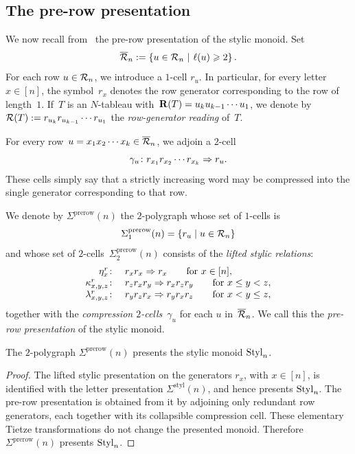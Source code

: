 \documentclass[a4paper, twoside, 11pt, english]{article}
\begin{document}
\subsection{The pre-row presentation}
\label{SS:PreRowPresentation}
We now recall from~\cite{LuoJinZhangStylic} the pre-row presentation of
the stylic monoid. Set
\[
\overline{\mathcal{R}}_n
:=
\left\{
u\in\mathcal{R}_n
\ \middle|\
\ell(u)\geqslant2
\right\}.
\]
For each row $u\in \mathcal{R}_n$, we introduce a $1$-cell $r_u$.
In particular, for every letter $x\in [n]$, the symbol~$r_x$ denotes the row generator
corresponding to the row of length~$1$. If~$T$ is an $N$-tableau with~$\mathbf{R}(T)= u_k u_{k-1} \cdots u_1$, we
denote by~$\mathcal{R}(T):=r_{u_k}r_{u_{k-1}}\cdots r_{u_1}$ the \emph{row-generator reading} of~$T$.

For every row~$u=x_1x_2\cdots x_k\in \overline{\mathcal{R}}_n$,
we adjoin a $2$-cell
\[
\gamma_u\colon r_{x_1}r_{x_2}\cdots r_{x_k}\Rightarrow r_u.
\]
These cells simply say that a strictly increasing word may be compressed into the single
generator corresponding to that row.

We denote by $\Sigma^{\mathrm{prerow}}(n)$ the $2$-polygraph whose set of $1$-cells is
\[
\Sigma^{\mathrm{prerow}}_1(n)=\{r_u\mid u\in \mathcal{R}_n\}
\]
and whose set of $2$-cells~$\Sigma^{\mathrm{prerow}}_2(n)$ consists of the \emph{lifted stylic relations}:
\[
\begin{array}{rl}
\eta_x^r\colon& r_xr_x\Rightarrow r_x
\qquad
\text{for }x\in [n],\\
\kappa_{x,y,z}^r\colon& r_zr_xr_y\Rightarrow r_xr_zr_y
\qquad
\text{for }x\le y<z,\\
\lambda_{x,y,z}^r\colon& r_yr_zr_x\Rightarrow r_yr_xr_z
\qquad
\text{for }x<y\le z,
\end{array}
\]
together with the \emph{compression $2$-cells}~$\gamma_u$ for each $u$ in~$\overline{\mathcal{R}}_n$.
We call this the \emph{pre-row presentation} of the stylic monoid.

\begin{proposition}
\label{P:PrerowPresentsStylic} 
The $2$-polygraph $\Sigma^{\mathrm{prerow}}(n)$ presents the stylic monoid $\mathrm{Styl}_n$. 
\end{proposition}

\begin{proof}
The lifted stylic presentation on the generators $r_x$, with $x\in[n]$, is
identified with the letter presentation $\Sigma^{\mathrm{styl}}(n)$, and hence
presents $\mathrm{Styl}_n$. The pre-row presentation is obtained from it by adjoining
only redundant row generators, each together with its collapsible compression
cell. These elementary Tietze transformations do not change the presented
monoid. Therefore $\Sigma^{\mathrm{prerow}}(n)$ presents $\mathrm{Styl}_n$.
\end{proof}
\end{document}

